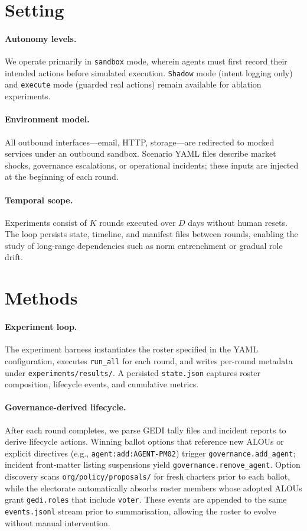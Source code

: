 \documentclass[11pt]{article}
\begin{document}
\section{Setting}
\paragraph{Autonomy levels.} We operate primarily in \texttt{sandbox} mode, wherein agents must first record their intended actions before simulated execution. \texttt{Shadow} mode (intent logging only) and \texttt{execute} mode (guarded real actions) remain available for ablation experiments.

\paragraph{Environment model.} All outbound interfaces—email, HTTP, storage—are redirected to mocked services under an outbound sandbox. Scenario YAML files describe market shocks, governance escalations, or operational incidents; these inputs are injected at the beginning of each round.

\paragraph{Temporal scope.} Experiments consist of $K$ rounds executed over $D$ days without human resets. The loop persists state, timeline, and manifest files between rounds, enabling the study of long-range dependencies such as norm entrenchment or gradual role drift.

\section{Methods}
\paragraph{Experiment loop.} The experiment harness instantiates the roster specified in the YAML configuration, executes \texttt{run\_all} for each round, and writes per-round metadata under \verb|experiments/results/|. A persisted \texttt{state.json} captures roster composition, lifecycle events, and cumulative metrics.

\paragraph{Governance-derived lifecycle.} After each round completes, we parse GEDI tally files and incident reports to derive lifecycle actions. Winning ballot options that reference new ALOUs or explicit directives (e.g., \texttt{agent:add:AGENT-PM02}) trigger \texttt{governance.add\_agent}; incident front-matter listing suspensions yield \texttt{governance.remove\_agent}. Option discovery scans \texttt{org/policy/proposals/} for fresh charters prior to each ballot, while the electorate automatically absorbs roster members whose adopted ALOUs grant \texttt{gedi.roles} that include \texttt{voter}. These events are appended to the same \verb|events.jsonl| stream prior to summarisation, allowing the roster to evolve without manual intervention.
\end{document}
